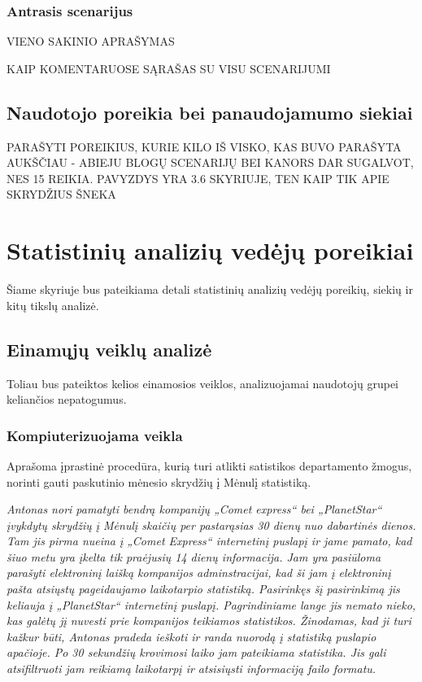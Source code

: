 \documentclass{VUMIFPSkursinis}
\begin{document}
\subsubsection{Antrasis scenarijus}
VIENO SAKINIO APRAŠYMAS

KAIP KOMENTARUOSE SĄRAŠAS SU VISU SCENARIJUMI

\subsection{Naudotojo poreikia bei panaudojamumo siekiai}
PARAŠYTI POREIKIUS, KURIE KILO IŠ VISKO, KAS BUVO PARAŠYTA AUKŠČIAU - ABIEJU BLOGŲ SCENARIJŲ BEI KANORS DAR SUGALVOT, NES 15 REIKIA. PAVYZDYS YRA 3.6 SKYRIUJE, TEN KAIP TIK APIE SKRYDŽIUS ŠNEKA



\section{Statistinių analizių vedėjų poreikiai}
Šiame skyriuje bus pateikiama detali statistinių analizių vedėjų poreikių, siekių ir kitų tikslų analizė.

\subsection{Einamųjų veiklų analizė}
Toliau bus pateiktos kelios einamosios veiklos, analizuojamai naudotojų grupei keliančios nepatogumus.

\subsubsection{Kompiuterizuojama veikla}
Aprašoma įprastinė procedūra, kurią turi atlikti satistikos departamento žmogus, norinti gauti paskutinio mėnesio skrydžių į Mėnulį statistiką.

\bigskip
\textit{Antonas nori pamatyti bendrą kompanijų „Comet express“ bei „PlanetStar“ įvykdytų skrydžių į Mėnulį skaičių per pastarąsias 30 dienų nuo dabartinės dienos. Tam jis pirma nueina į „Comet Express“ internetinį puslapį ir jame pamato, kad šiuo metu yra įkelta tik praėjusių 14 dienų informacija. Jam yra pasiūloma parašyti elektroninį laišką kompanijos adminstracijai, kad ši jam į elektroninį pašta atsiųstų pageidaujamo laikotarpio statistiką. Pasirinkęs šį pasirinkimą jis keliauja į „PlanetStar“ internetinį puslapį. Pagrindiniame lange jis nemato nieko, kas galėtų jį nuvesti prie kompanijos teikiamos statistikos. Žinodamas, kad ji turi kažkur būti, Antonas pradeda ieškoti ir randa nuorodą į statistiką puslapio apačioje. Po 30 sekundžių krovimosi laiko jam pateikiama statistika. Jis gali atsifiltruoti jam reikiamą laikotarpį ir atsisiųsti informaciją failo formatu.}
\end{document}
